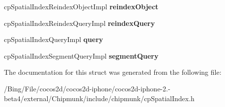 \begin{DoxyCompactItemize}
\item 
\hypertarget{structcp_spatial_index_class_ae727936ae5fdcb723c9aea0577083bf6}{cp\-Spatial\-Index\-Reindex\-Object\-Impl {\bfseries reindex\-Object}}\label{structcp_spatial_index_class_ae727936ae5fdcb723c9aea0577083bf6}

\item 
\hypertarget{structcp_spatial_index_class_a60088d6e38cafcba2fde0c41086be83a}{cp\-Spatial\-Index\-Reindex\-Query\-Impl {\bfseries reindex\-Query}}\label{structcp_spatial_index_class_a60088d6e38cafcba2fde0c41086be83a}

\item 
\hypertarget{structcp_spatial_index_class_a92ef2e203e2f5162ce7d673a6d538377}{cp\-Spatial\-Index\-Query\-Impl {\bfseries query}}\label{structcp_spatial_index_class_a92ef2e203e2f5162ce7d673a6d538377}

\item 
\hypertarget{structcp_spatial_index_class_a02bf5963d4fdba46b3ecaa689b24d5cd}{cp\-Spatial\-Index\-Segment\-Query\-Impl {\bfseries segment\-Query}}\label{structcp_spatial_index_class_a02bf5963d4fdba46b3ecaa689b24d5cd}

\end{DoxyCompactItemize}


The documentation for this struct was generated from the following file\-:\begin{DoxyCompactItemize}
\item 
/\-Bing/\-File/cocos2d/cocos2d-\/iphone/cocos2d-\/iphone-\/2.-\/beta4/external/\-Chipmunk/include/chipmunk/cp\-Spatial\-Index.\-h\end{DoxyCompactItemize}
